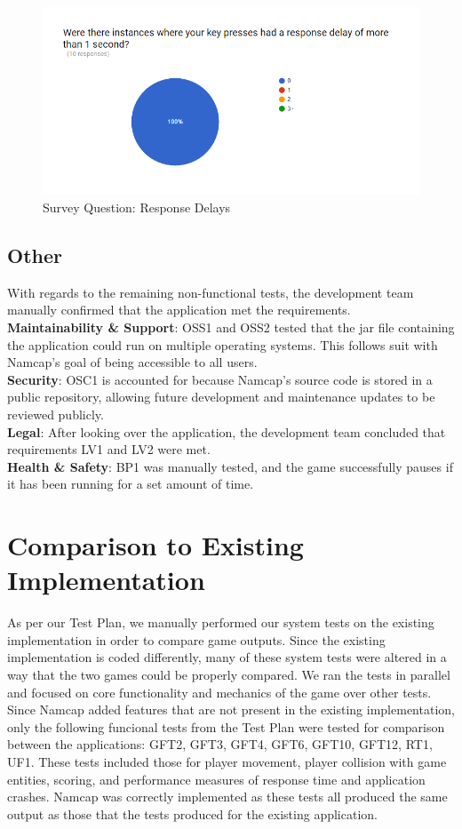 \documentclass[12pt, titlepage]{article}
\begin{document}
\begin{figure}[H]
\centering
\includegraphics[width=1.0\textwidth]{SurveyQuestion10.png}
\caption{Survey Question: Response Delays}
\label{FigSQ10}
\end{figure}

\subsection{Other}

With regards to the remaining non-functional tests, the development team manually confirmed that the application met the requirements. \\
{\bf Maintainability \& Support}: OSS1 and OSS2 tested that the jar file containing the application could run on multiple operating systems. This follows suit with Namcap's goal of being accessible to all users.\\
{\bf Security}: OSC1 is accounted for because Namcap's source code is stored in a public repository, allowing future development and maintenance updates to be reviewed publicly.\\
{\bf Legal}: After looking over the application, the development team concluded that requirements LV1 and LV2 were met.\\
{\bf Health \& Safety}: BP1 was manually tested, and the game successfully pauses if it has been running for a set amount of time.
	
\section{Comparison to Existing Implementation}	

As per our Test Plan, we manually performed our system tests on the existing implementation in order to compare game outputs. Since the existing implementation is coded differently, many of these system tests were altered in a way that the two games could be properly compared. We ran the tests in parallel and focused on core functionality and mechanics of the game over other tests. Since Namcap added features that are not present in the existing implementation, only the following funcional tests from the Test Plan were tested for comparison between the applications: GFT2, GFT3, GFT4, GFT6, GFT10, GFT12, RT1, UF1. These tests included those for player movement, player collision with game entities, scoring, and performance measures of response time and application crashes. Namcap was correctly implemented as these tests all produced the same output as those that the tests produced for the existing application.
\end{document}

